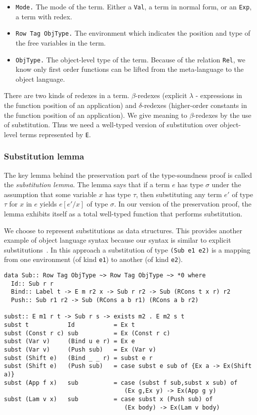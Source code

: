 \documentclass[11pt,twoside,A4]{llncs}
\begin{document}
\begin{itemize}
\item{\tt Mode.} The mode of the term. Either a {\tt Val}, a term
in normal form, or an {\tt Exp}, a term with redex.

\item{\tt Row Tag ObjType.} The environment which indicates
the position and type of the free variables in the term.

\item{\tt ObjType.} The object-level type of the term. Because of the
relation {\tt Rel}, we know only first order functions
can be lifted from the meta-language to the object language.
\end{itemize}

There are two kinds of redexes in a term. $\beta$-redexes 
(explicit $\lambda$ - expressions in the function position
of an application) and $\delta$-redexes (higher-order
constants in the function position
of an application). We give meaning
to $\beta$-redexes by the use of substitution. Thus we
need a well-typed version of substitution over object-level terms
represented by {\tt E}.


\subsubsection{Substitution lemma}

The key lemma behind the preservation part of the type-soundness proof is called
the \emph{substitution lemma}. The lemma says that if a term $e$ has type
$\sigma$ under the assumption that some variable $x$ has type $\tau$, then
substituting any term $e'$ of type $\tau$ for $x$ in $e$ yields $e[e'/x]$
of type $\sigma$. In our version of the preservation proof, the lemma
exhibits itself as a total well-typed function that performs substitution.

We choose to represent substitutions as data structures. This provides
another example of object language syntax because our syntax is similar to
explicit substitutions~\cite{BenaissaBLR96}. In this approach a
substitution of type {\tt (Sub e1 e2)} is a mapping from one environment
(of kind {\tt e1}) to another (of kind {\tt e2}).

{\small
\begin{verbatim}
data Sub:: Row Tag ObjType ~> Row Tag ObjType ~> *0 where
  Id:: Sub r r
  Bind:: Label t -> E m r2 x -> Sub r r2 -> Sub (RCons t x r) r2
  Push:: Sub r1 r2 -> Sub (RCons a b r1) (RCons a b r2)

subst:: E m1 r t -> Sub r s -> exists m2 . E m2 s t
subst t           Id           = Ex t
subst (Const r c) sub          = Ex (Const r c)
subst (Var v)     (Bind u e r) = Ex e
subst (Var v)     (Push sub)   = Ex (Var v)
subst (Shift e)   (Bind _ _ r) = subst e r
subst (Shift e)   (Push sub)   = case subst e sub of {Ex a -> Ex(Shift a)}
subst (App f x)   sub          = case (subst f sub,subst x sub) of
                                  (Ex g,Ex y) -> Ex(App g y)
subst (Lam v x)   sub          = case subst x (Push sub) of
                                  (Ex body) -> Ex(Lam v body)
\end{verbatim}}
\end{document}
